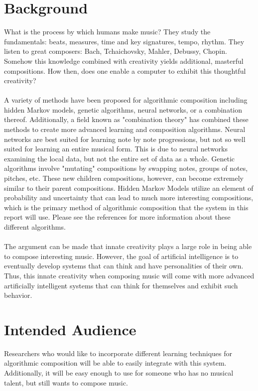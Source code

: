 \documentclass{article}
\begin{document}
\section{Background}
What is the process by which humans make music? They study the fundamentals: beats, measures, time and key signatures, tempo, rhythm. They listen to great composers: Bach, Tchaichovsky, Mahler, Debussy, Chopin. Somehow this knowledge combined with creativity yields additional, masterful compositions. How then, does one enable a computer to exhibit this thoughtful creativity?\\
\\
A variety of methods have been proposed for algorithmic composition including hidden Markov models\cite{5492670}, genetic algorithms, neural networks, or a combination thereof\cite{4626654}. Additionally, a field known as "combination theory" has combined these methods to create more advanced learning and composition algorithms. Neural networks are best suited for learning note by note progressions, but not so well suited for learning an entire musical form. This is due to neural networks examining the local data, but not the entire set of data as a whole. Genetic algorithms involve "mutating" compositions by swapping notes, groups of notes, pitches, etc. These new children compositions, however, can become extremely similar to their parent compositions. Hidden Markov Models utilize an element of probability and uncertainty that can lead to much more interesting compositions, which is the primary method of algorithmic composition that the system in this report will use. Please see the references
for more information about these different algorithms.\\
\\
The argument can be made that innate creativity plays a large role in being able to compose interesting music.  However, the goal of artificial intelligence is to eventually develop systems that can think and have personalities of their own.  Thus, this innate creativity when composing music will come with more advanced artificially intelligent systems that can think for themselves and exhibit such behavior.
\section{Intended Audience}
Researchers who would like to incorporate different learning techniques for algorithmic composition will be able to easily integrate with this system. Additionally, it will be easy enough to use for someone who has no musical talent, but still wants to compose music.
\end{document}

